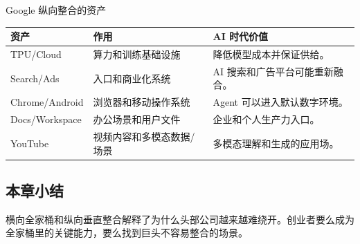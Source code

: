 \begin{knowledgebox}{Google 纵向整合的资产}
\begin{tabularx}{\textwidth}{p{}p{}X}
\toprule
资产 & 作用 & AI 时代价值 \\
\midrule
TPU/Cloud & 算力和训练基础设施 & 降低模型成本并保证供给。 \\
Search/Ads & 入口和商业化系统 & AI 搜索和广告平台可能重新融合。 \\
Chrome/Android & 浏览器和移动操作系统 & Agent 可以进入默认数字环境。 \\
Docs/Workspace & 办公场景和用户文件 & 企业和个人生产力入口。 \\
YouTube & 视频内容和多模态数据/场景 & 多模态理解和生成的应用场。 \\
\bottomrule
\end{tabularx}
\end{knowledgebox}

\subsection{本章小结}

横向全家桶和纵向垂直整合解释了为什么头部公司越来越难绕开。创业者要么成为全家桶里的关键能力，要么找到巨头不容易整合的场景。

